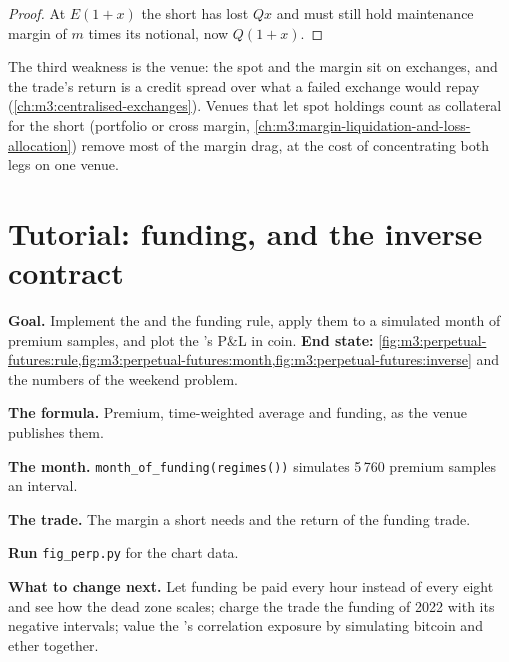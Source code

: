 \begin{proof}
At $E(1+x)$ the short has lost $Qx$ and must still hold maintenance margin of $m$ times its notional, now $Q(1+x)$.
\end{proof}

The third weakness is the venue: the spot and the margin sit on exchanges, and the trade's return is a credit spread
over what a failed exchange would repay (\cref{ch:m3:centralised-exchanges}). Venues that let spot holdings count as
collateral for the short (portfolio or cross margin, \cref{ch:m3:margin-liquidation-and-loss-allocation}) remove most
of the margin drag, at the cost of concentrating both legs on one venue.

\section{Tutorial: funding, and the inverse contract}\label{tut:m3:perpetual-futures:funding}

\begin{tutorial}
\textbf{Goal.} Implement the  and the funding rule, apply them to a simulated month of premium samples,
and plot the 's P\&L in coin. \textbf{End state:}
\cref{fig:m3:perpetual-futures:rule,fig:m3:perpetual-futures:month,fig:m3:perpetual-futures:inverse} and the numbers
of the weekend problem.
\begin{tutsteps}
\item \textbf{The formula.} Premium, time-weighted average and funding, as the venue publishes them.
\label{lst:m3:perpetual-futures:funding}
\item \textbf{The month.} \texttt{month\_of\_funding(regimes())} simulates 5\,760 premium samples an interval.
\item \textbf{The trade.} The margin a short needs and the return of the funding trade.
\label{lst:m3:perpetual-futures:trade}
\item \textbf{Run} \texttt{fig\_perp.py} for the chart data.
\end{tutsteps}
\textbf{What to change next.} Let funding be paid every hour instead of every eight and see how the dead zone scales;
charge the trade the funding of 2022 with its negative intervals; value the 's correlation exposure by
simulating bitcoin and ether together.
\end{tutorial}

